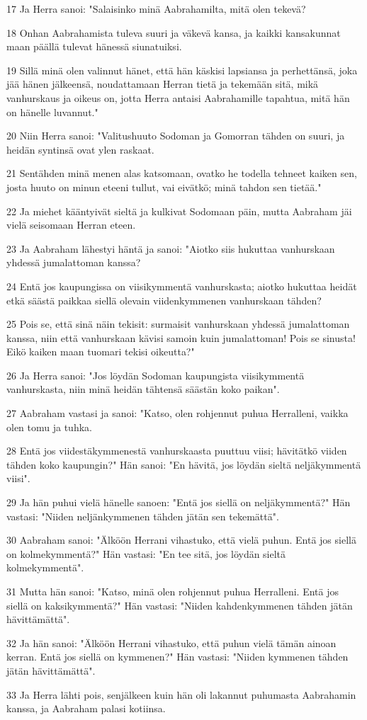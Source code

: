 \par 17 Ja Herra sanoi: "Salaisinko minä Aabrahamilta, mitä olen tekevä?
\par 18 Onhan Aabrahamista tuleva suuri ja väkevä kansa, ja kaikki kansakunnat maan päällä tulevat hänessä siunatuiksi.
\par 19 Sillä minä olen valinnut hänet, että hän käskisi lapsiansa ja perhettänsä, joka jää hänen jälkeensä, noudattamaan Herran tietä ja tekemään sitä, mikä vanhurskaus ja oikeus on, jotta Herra antaisi Aabrahamille tapahtua, mitä hän on hänelle luvannut."
\par 20 Niin Herra sanoi: "Valitushuuto Sodoman ja Gomorran tähden on suuri, ja heidän syntinsä ovat ylen raskaat.
\par 21 Sentähden minä menen alas katsomaan, ovatko he todella tehneet kaiken sen, josta huuto on minun eteeni tullut, vai eivätkö; minä tahdon sen tietää."
\par 22 Ja miehet kääntyivät sieltä ja kulkivat Sodomaan päin, mutta Aabraham jäi vielä seisomaan Herran eteen.
\par 23 Ja Aabraham lähestyi häntä ja sanoi: "Aiotko siis hukuttaa vanhurskaan yhdessä jumalattoman kanssa?
\par 24 Entä jos kaupungissa on viisikymmentä vanhurskasta; aiotko hukuttaa heidät etkä säästä paikkaa siellä olevain viidenkymmenen vanhurskaan tähden?
\par 25 Pois se, että sinä näin tekisit: surmaisit vanhurskaan yhdessä jumalattoman kanssa, niin että vanhurskaan kävisi samoin kuin jumalattoman! Pois se sinusta! Eikö kaiken maan tuomari tekisi oikeutta?"
\par 26 Ja Herra sanoi: "Jos löydän Sodoman kaupungista viisikymmentä vanhurskasta, niin minä heidän tähtensä säästän koko paikan".
\par 27 Aabraham vastasi ja sanoi: "Katso, olen rohjennut puhua Herralleni, vaikka olen tomu ja tuhka.
\par 28 Entä jos viidestäkymmenestä vanhurskaasta puuttuu viisi; hävitätkö viiden tähden koko kaupungin?" Hän sanoi: "En hävitä, jos löydän sieltä neljäkymmentä viisi".
\par 29 Ja hän puhui vielä hänelle sanoen: "Entä jos siellä on neljäkymmentä?" Hän vastasi: "Niiden neljänkymmenen tähden jätän sen tekemättä".
\par 30 Aabraham sanoi: "Älköön Herrani vihastuko, että vielä puhun. Entä jos siellä on kolmekymmentä?" Hän vastasi: "En tee sitä, jos löydän sieltä kolmekymmentä".
\par 31 Mutta hän sanoi: "Katso, minä olen rohjennut puhua Herralleni. Entä jos siellä on kaksikymmentä?" Hän vastasi: "Niiden kahdenkymmenen tähden jätän hävittämättä".
\par 32 Ja hän sanoi: "Älköön Herrani vihastuko, että puhun vielä tämän ainoan kerran. Entä jos siellä on kymmenen?" Hän vastasi: "Niiden kymmenen tähden jätän hävittämättä".
\par 33 Ja Herra lähti pois, senjälkeen kuin hän oli lakannut puhumasta Aabrahamin kanssa, ja Aabraham palasi kotiinsa.

